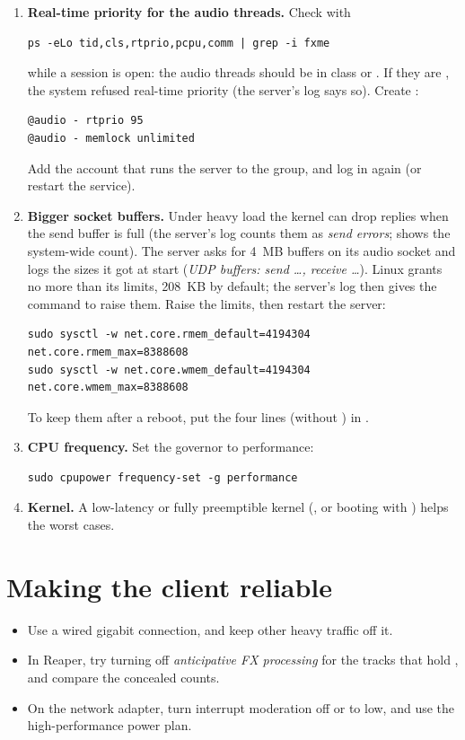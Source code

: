 \begin{enumerate}
  \item \textbf{Real-time priority for the audio threads.} Check with
\begin{lstlisting}
ps -eLo tid,cls,rtprio,pcpu,comm | grep -i fxme
\end{lstlisting}
    while a session is open: the audio threads should be in class 
    or . If they are , the system refused real-time priority
    (the server's log says so). Create
    :
\begin{lstlisting}[language={}]
@audio - rtprio 95
@audio - memlock unlimited
\end{lstlisting}
    Add the account that runs the server to the  group, and log in
    again (or restart the service).
  \item \textbf{Bigger socket buffers.} Under heavy load the kernel can drop
    replies when the send buffer is full (the server's log counts them as
    \emph{send errors};  shows the
    system-wide count). The server asks for 4~MB buffers on its audio
    socket and logs the sizes it got at start (\emph{UDP buffers: send
    \ldots, receive \ldots}). Linux grants no more than its limits, 208~KB
    by default; the server's log then gives the command to raise them.
    Raise the limits, then restart the server:
\begin{lstlisting}
sudo sysctl -w net.core.rmem_default=4194304 net.core.rmem_max=8388608
sudo sysctl -w net.core.wmem_default=4194304 net.core.wmem_max=8388608
\end{lstlisting}
    To keep them after a reboot, put the four lines (without ) in .
  \item \textbf{CPU frequency.} Set the governor to performance:
\begin{lstlisting}
sudo cpupower frequency-set -g performance
\end{lstlisting}
  \item \textbf{Kernel.} A low-latency or fully preemptible kernel
    (, or booting with ) helps the
    worst cases.
\end{enumerate}


\section{Making the client reliable}

\begin{itemize}
  \item Use a wired gigabit connection, and keep other heavy traffic off it.
  \item In Reaper, try turning off \emph{anticipative FX processing} for the
    tracks that hold , and compare the concealed counts.
  \item On the network adapter, turn interrupt moderation off or to low, and
    use the high-performance power plan.
\end{itemize}
